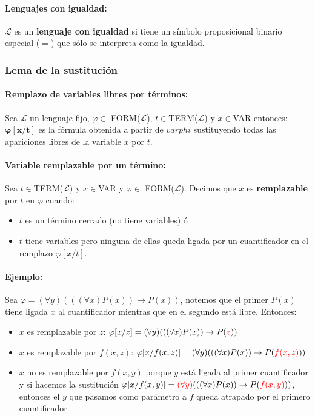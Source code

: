 \paragraph{Lenguajes con igualdad:} $\mathcal{L}$ es un \textbf{lenguaje con igualdad} si tiene un símbolo proposicional binario especial ($=$) que sólo se interpreta como la igualdad.

\subsubsection{Lema de la sustitución}

\paragraph{Remplazo de variables libres por términos:} Sea $\mathcal{L}$ un lenguaje fijo, $\varphi\in$ FORM($\mathcal{L}$), $t\in$TERM($\mathcal{L}$) y $x\in$VAR entonces: $\bm{\varphi[x/t]}$ es la fórmula obtenida a partir de $varphi$ sustituyendo todas las apariciones libres de la variable $x$ por $t$.

\paragraph{Variable remplazable por un término:} Sea $t\in$TERM($\mathcal{L}$) y $x\in$VAR y $\varphi\in$ FORM($\mathcal{L}$). Decimos que $x$ es \textbf{remplazable} por $t$ en $\varphi$ cuando:
\begin{itemize}
	\item $t$ es un término cerrado (no tiene variables) ó
	\item $t$ tiene variables pero ninguna de ellas queda ligada por un cuantificador en el remplazo $\varphi[x/t]$.
\end{itemize}

\paragraph{Ejemplo:} Sea $\varphi=(\forall y)(((\forall x)P(x))\to P(x))$, notemos que el primer $P(x)$ tiene ligada $x$ al cuantificador mientras que en el segundo está libre. Entonces:
\begin{itemize}
	\item $x$ es remplazable por $z$: $\varphi[x/z] = (\forall y)(((\forall x)P(x))\to P({\color{red}z}))$
	\item $x$ es remplazable por $f(x,z)$: $\varphi[x/f(x,z)] = (\forall y)(((\forall x)P(x))\to P({\color{red}f(x,z)}))$
	\item $x$ no es remplazable por $f(x,y)$ porque $y$ está ligada al primer cuantificador y si hacemos la sustitución $\varphi[x/f(x,y)] = {\color{red}(\forall y)}(((\forall x)P(x))\to P({\color{red}f(x,y)}))$, entonces el $y$ que pasamos como parámetro a $f$ queda atrapado por el primero cuantificador.
\end{itemize}

